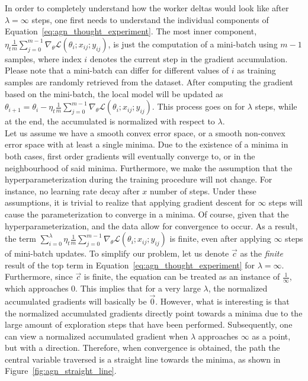 \documentclass[wcp]{jmlr}
\begin{document}
In order to completely understand how the worker deltas would look like after $\lambda = \infty$ steps, one first needs to understand the individual components of Equation~\ref{eq:agn_thought_experiment}. The most inner component, $\eta_t \frac{1}{m}\sum_{j = 0}^{m - 1} \nabla_\theta \mathcal{L}(\theta_i;x_{ij};y_{ij})$, is just the computation of a mini-batch using $m - 1$ samples, where index $i$ denotes the current step in the gradient accumulation. Please note that a mini-batch can differ for different values of $i$ as training samples are randomly retrieved from the dataset. After computing the gradient based on the mini-batch, the local model will be updated as $\theta_{i + 1} = \theta_i - \eta_t\frac{1}{m}\sum_{j = 0}^{m - 1} \nabla_\theta \mathcal{L}(\theta_i;x_{ij};y_{ij})$. This process goes on for $\lambda$ steps, while at the end, the accumulated is normalized with respect to $\lambda$.\\

Let us assume we have a smooth convex error space, or a smooth non-convex error space with at least a single minima. Due to the existence of a minima in both cases, first order gradients will eventually converge to, or in the neighbourhood of said minima. Furthermore, we  make the assumption that the hyperparameterization during the training procedure will not change. For instance, no learning rate decay after $x$ number of steps. Under these assumptions, it is trivial to realize that applying gradient descent for $\infty$ steps will cause the parameterization to converge in a minima. Of course, given that the hyperparameterization, and the data allow for convergence to occur. As a result, the term $\sum_{i = 0}^\lambda \eta_t \frac{1}{m}\sum_{j = 0}^{m - 1} \nabla_\theta \mathcal{L}(\theta_i;x_{ij};y_{ij})$ is finite, even after applying $\infty$ steps of mini-batch updates. To simplify our problem, let us denote $\vec{c}$ as the \emph{finite} result of the top term in Equation~\ref{eq:agn_thought_experiment} for $\lambda = \infty$. Furthermore, since $\vec{c}$ is finite, the equation can be treated as an instance of $\frac{1}{\infty}$, which approaches 0. This implies that for a very large $\lambda$, the normalized accumulated gradients will basically be $\vec{0}$. However, what is interesting is that the normalized accumulated gradients directly point towards a minima due to the large amount of exploration steps that have been performed. Subsequently, one can view a normalized accumulated gradient when $\lambda$ approaches $\infty$ as a point, but with a direction. Therefore, when convergence is obtained, the path the central variable traversed is a straight line towards the minima, as shown in Figure~\ref{fig:agn_straight_line}.\\
\end{document}
